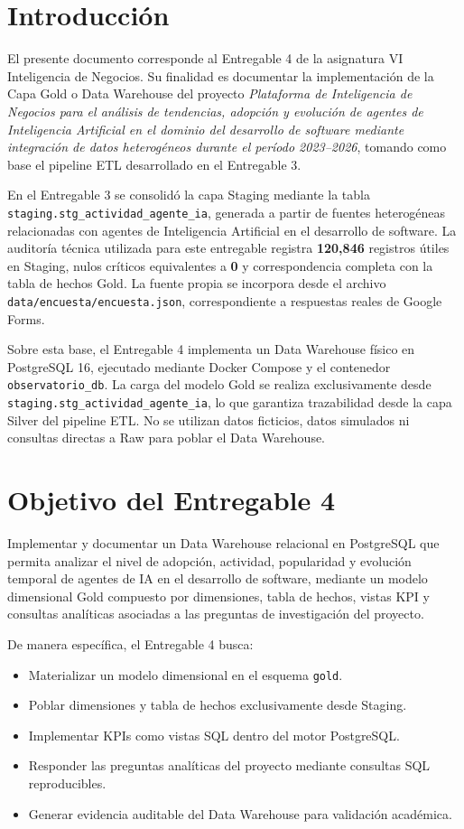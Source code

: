 \documentclass[12pt,a4paper]{article}
\newcommand{\ProjectTitle}{Plataforma de Inteligencia de Negocios para el an\'alisis de tendencias, adopci\'on y evoluci\'on de agentes de Inteligencia Artificial en el dominio del desarrollo de software mediante integraci\'on de datos heterog\'eneos durante el per\'iodo 2023--2026}
\newcommand{\StagingTabla}{\texttt{staging.\allowbreak stg\_actividad\_\allowbreak agente\_ia}}
\newcommand{\pathcode}[1]{\begingroup\scriptsize\ttfamily\nolinkurl{#1}\endgroup}
\begin{document}
\tableofcontents
\newpage

\section{Introducci\'on}

El presente documento corresponde al Entregable 4 de la asignatura VI Inteligencia de Negocios. Su finalidad es documentar la implementaci\'on de la Capa Gold o Data Warehouse del proyecto \textit{\ProjectTitle}, tomando como base el pipeline ETL desarrollado en el Entregable 3.

En el Entregable 3 se consolid\'o la capa Staging mediante la tabla \StagingTabla{}, generada a partir de fuentes heterog\'eneas relacionadas con agentes de Inteligencia Artificial en el desarrollo de software. La auditor\'ia t\'ecnica utilizada para este entregable registra \textbf{120,846} registros \'utiles en Staging, nulos cr\'iticos equivalentes a \textbf{0} y correspondencia completa con la tabla de hechos Gold. La fuente propia se incorpora desde el archivo \pathcode{data/encuesta/encuesta.json}, correspondiente a respuestas reales de Google Forms.

Sobre esta base, el Entregable 4 implementa un Data Warehouse f\'isico en PostgreSQL 16, ejecutado mediante Docker Compose y el contenedor \texttt{observatorio\_db}. La carga del modelo Gold se realiza exclusivamente desde \StagingTabla{}, lo que garantiza trazabilidad desde la capa Silver del pipeline ETL. No se utilizan datos ficticios, datos simulados ni consultas directas a Raw para poblar el Data Warehouse.

\section{Objetivo del Entregable 4}

Implementar y documentar un Data Warehouse relacional en PostgreSQL que permita analizar el nivel de adopci\'on, actividad, popularidad y evoluci\'on temporal de agentes de IA en el desarrollo de software, mediante un modelo dimensional Gold compuesto por dimensiones, tabla de hechos, vistas KPI y consultas anal\'iticas asociadas a las preguntas de investigaci\'on del proyecto.

De manera espec\'ifica, el Entregable 4 busca:

\begin{itemize}[leftmargin=1.2cm]
    \item Materializar un modelo dimensional en el esquema \texttt{gold}.
    \item Poblar dimensiones y tabla de hechos exclusivamente desde Staging.
    \item Implementar KPIs como vistas SQL dentro del motor PostgreSQL.
    \item Responder las preguntas anal\'iticas del proyecto mediante consultas SQL reproducibles.
    \item Generar evidencia auditable del Data Warehouse para validaci\'on acad\'emica.
\end{itemize}
\end{document}
